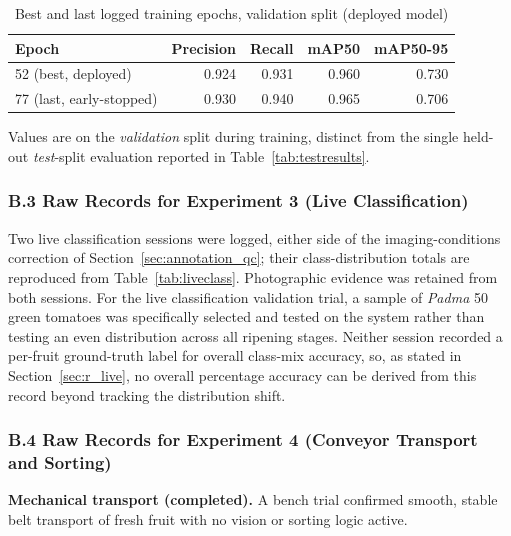 \begin{table}[H]
\caption{Best and last logged training epochs, validation split (deployed model)}
\label{tab:appendixB_epochs}
\centering
\begin{tabular}{lrrrr}
\toprule
\textbf{Epoch} & \textbf{Precision} & \textbf{Recall} & \textbf{mAP50} & \textbf{mAP50-95} \\
\midrule
52 (best, deployed) & 0.924 & 0.931 & 0.960 & 0.730 \\
77 (last, early-stopped) & 0.930 & 0.940 & 0.965 & 0.706 \\
\bottomrule
\end{tabular}

\vspace{2mm}
{\footnotesize Values are on the \emph{validation} split during training, distinct from the single held-out \emph{test}-split evaluation reported in Table~\ref{tab:testresults}.}
\end{table}



\subsubsection*{B.3 Raw Records for Experiment 3 (Live Classification)}

Two live classification sessions were logged, either side of the imaging-conditions correction of Section~\ref{sec:annotation_qc}; their class-distribution totals are reproduced from Table~\ref{tab:liveclass}. Photographic evidence was retained from both sessions. For the live classification validation trial, a sample of \textit{Padma} 50 green tomatoes was specifically selected and tested on the system rather than testing an even distribution across all ripening stages. Neither session recorded a per-fruit ground-truth label for overall class-mix accuracy, so, as stated in Section~\ref{sec:r_live}, no overall percentage accuracy can be derived from this record beyond tracking the distribution shift.



\subsubsection*{B.4 Raw Records for Experiment 4 (Conveyor Transport and Sorting)}

\textbf{Mechanical transport (completed).} A bench trial confirmed smooth, stable belt transport of fresh fruit with no vision or sorting logic active.

